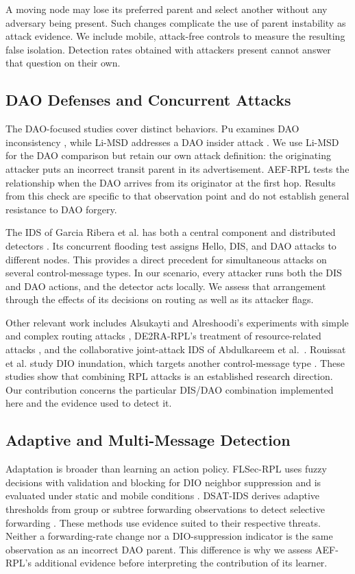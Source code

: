 A moving node may lose its preferred parent and select another without any adversary being present. Such changes complicate the use of parent instability as attack evidence. We include mobile, attack-free controls to measure the resulting false isolation. Detection rates obtained with attackers present cannot answer that question on their own.

\subsection{DAO Defenses and Concurrent Attacks}
The DAO-focused studies cover distinct behaviors. Pu examines DAO inconsistency \cite{pu2018}, while Li-MSD addresses a DAO insider attack \cite{limsd2024}. We use Li-MSD for the DAO comparison but retain our own attack definition: the originating attacker puts an incorrect transit parent in its advertisement. AEF-RPL tests the relationship when the DAO arrives from its originator at the first hop. Results from this check are specific to that observation point and do not establish general resistance to DAO forgery.

The IDS of Garcia Ribera et al. has both a central component and distributed detectors \cite{garciaribera2022}. Its concurrent flooding test assigns Hello, DIS, and DAO attacks to different nodes. This provides a direct precedent for simultaneous attacks on several control-message types. In our scenario, every attacker runs both the DIS and DAO actions, and the detector acts locally. We assess that arrangement through the effects of its decisions on routing as well as its attacker flags.

Other relevant work includes Alsukayti and Alreshoodi's experiments with simple and complex routing attacks \cite{alsukayti2023}, DE2RA-RPL's treatment of resource-related attacks \cite{de2rarpl2024}, and the collaborative joint-attack IDS of Abdulkareem et al.\ \cite{abdulkareem2024}. Rouissat et al. study DIO inundation, which targets another control-message type \cite{rouissat2023}. These studies show that combining RPL attacks is an established research direction. Our contribution concerns the particular DIS/DAO combination implemented here and the evidence used to detect it.

\subsection{Adaptive and Multi-Message Detection}
Adaptation is broader than learning an action policy. FLSec-RPL uses fuzzy decisions with validation and blocking for DIO neighbor suppression and is evaluated under static and mobile conditions \cite{flsecrpl2024}. DSAT-IDS derives adaptive thresholds from group or subtree forwarding observations to detect selective forwarding \cite{dsatids2024}. These methods use evidence suited to their respective threats. Neither a forwarding-rate change nor a DIO-suppression indicator is the same observation as an incorrect DAO parent. This difference is why we assess AEF-RPL's additional evidence before interpreting the contribution of its learner.

